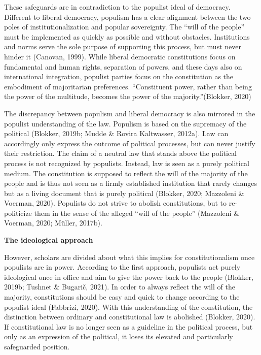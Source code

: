 \documentclass[
  abstract]{article}
\begin{document}
These safeguards are in contradiction to the populist ideal of
democracy. Different to liberal democracy, populism has a clear
alignment between the two poles of institutionalization and popular
sovereignty. The ``will of the people'' must be implemented as quickly
as possible and without obstacles. Institutions and norms serve the sole
purpose of supporting this process, but must never hinder it (Canovan,
1999). While liberal democratic constitutions focus on fundamental and
human rights, separation of powers, and these days also on international
integration, populist parties focus on the constitution as the
embodiment of majoritarian preferences. ``Constituent power, rather than
being the power of the multitude, becomes the power of the
majority.''(Blokker, 2020)

The discrepancy between populism and liberal democracy is also mirrored
in the populist understanding of the law. Populism is based on the
supremacy of the political (Blokker, 2019b; Mudde \& Rovira Kaltwasser,
2012a). Law can accordingly only express the outcome of political
processes, but can never justify their restriction. The claim of a
neutral law that stands above the political process is not recognized by
populists. Instead, law is seen as a purely political medium. The
constitution is supposed to reflect the will of the majority of the
people and is thus not seen as a firmly established institution that
rarely changes but as a living document that is purely political
(Blokker, 2020; Mazzoleni \& Voerman, 2020). Populists do not strive to
abolish constitutions, but to re-politicize them in the sense of the
alleged ``will of the people'' (Mazzoleni \& Voerman, 2020; Müller,
2017b).

\textbf{The ideological approach}

However, scholars are divided about what this implies for
constitutionalism once populists are in power. According to the first
approach, populists act purely ideological once in office and aim to
give the power back to the people (Blokker, 2019b; Tushnet \& Bugarič,
2021). In order to always reflect the will of the majority,
constitutions should be easy and quick to change according to the
populist ideal (Fabbrizi, 2020). With this understanding of the
constitution, the distinction between ordinary and constitutional law is
abolished (Blokker, 2020). If constitutional law is no longer seen as a
guideline in the political process, but only as an expression of the
political, it loses its elevated and particularly safeguarded position.
\end{document}
